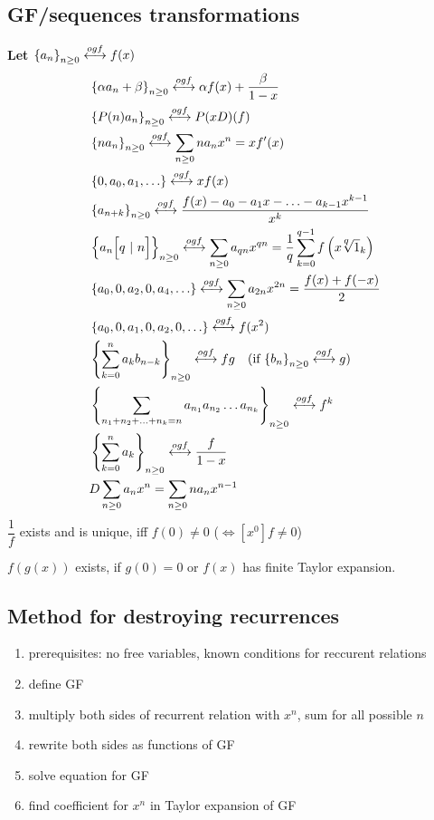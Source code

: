 \subsection{GF/sequences transformations}
\textbf{Let $\left\lbrace a_n\right\rbrace_{n\geq 0} \overset{ogf}{\longleftrightarrow} f(x)$}
\begin{align*}
&\nseq{\alpha a_n + \beta} \ogf \alpha f(x) + \dfrac{\beta}{1-x}\\
&\nseq{P(n) a_n} \ogf P(xD)(f)\\
&\nseq{n a_n} \ogf \sum_{n\geq 0} n a_n x^n = x f'(x) \\
&\seq{0, a_0, a_1, \ldots} \ogf x f(x)\\
&\nseq{a_{n+k}} \ogf \dfrac{f(x) - a_0 - a_1 x - \ldots - a_{k-1} x^{k-1}}{x^k}\\
&\nseq{a_n \Big[q ~|~ n\Big]} \ogf \sum_{n \geq 0} a_{qn} x^{qn} =
\dfrac{1}{q} \sum_{k=0}^{q-1} f\left(x \nthroot{q}{1}_{k} \right)\\
&\seq{a_0, 0, a_2, 0, a_4, \ldots} \ogf \sum_{n\geq 0} a_{2n}x^{2n} = \dfrac{f(x) + f(-x)}{2}\\
&\seq{a_0, 0, a_1, 0, a_2, 0, \ldots} \ogf f(x^2)\\
&\nseq{\sum_{k=0}^{n} a_k b_{n-k}} \ogf fg ~~~ \text{(if $\nseq{b_n} \ogf g$)}\\
&\nseq{\sum_{n_1 + n_2 + \ldots + n_k = n} a_{n_1} a_{n_2} \ldots a_{n_k}} \ogf f^k\\
&\nseq{\sum_{k=0}^n a_k} \ogf \dfrac{f}{1-x}\\
&D \sum_{n\geq 0} a_n x^n = \sum_{n\geq 0} n a_n x^{n-1}
\end{align*}
$\dfrac{1}{f}$ exists and is unique, iff $f(0) \neq 0$ ($ \Leftrightarrow [x^0]f \neq 0$)

$f(g(x))$ exists, if $g(0) = 0$ or $f(x)$ has finite Taylor expansion.

\subsection{Method for destroying recurrences}
\begin{enumerate}
  \item prerequisites: no free variables, known conditions for reccurent relations
  \item define GF
  \item multiply both sides of recurrent relation with $x^n$, sum for all possible $n$
  \item rewrite both sides as functions of GF
  \item solve equation for GF
  \item find coefficient for $x^n$ in Taylor expansion of GF
\end{enumerate}

